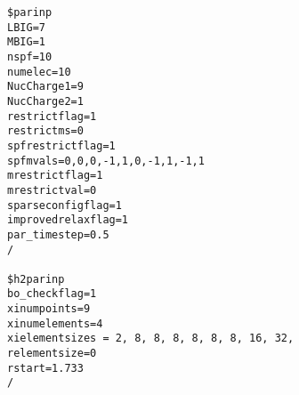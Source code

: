 {\footnotesize \begin{verbatim}
$parinp
LBIG=7
MBIG=1
nspf=10
numelec=10
NucCharge1=9
NucCharge2=1
restrictflag=1
restrictms=0
spfrestrictflag=1
spfmvals=0,0,0,-1,1,0,-1,1,-1,1
mrestrictflag=1
mrestrictval=0
sparseconfigflag=1
improvedrelaxflag=1
par_timestep=0.5  
/

$h2parinp
bo_checkflag=1
xinumpoints=9
xinumelements=4
xielementsizes = 2, 8, 8, 8, 8, 8, 8, 16, 32, 
relementsize=0
rstart=1.733
/
\end{verbatim}}
